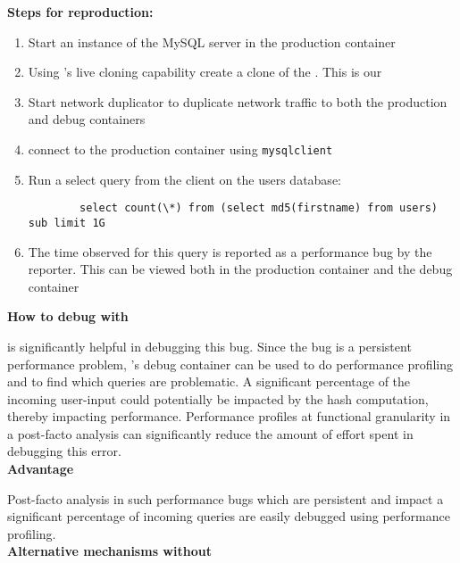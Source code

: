 \noindent \textbf{Steps for reproduction:} \\

\begin{adjustwidth}{0.5cm}{}
	\begin{enumerate}
		\item Start an instance of the MySQL server in the production container
		\item Using \parikshan's live cloning capability create a clone of the \productioncontainer. This is our \debugcontainer
		\item Start network duplicator to duplicate network traffic to both the production and debug containers
		\item connect to the production container using \texttt{mysqlclient}
		\item Run a select query from the client on the users database:
		
		\begin{lstlisting}
		select count(\*) from (select md5(firstname) from users) sub limit 1G
		\end{lstlisting}
		
		\item The time observed for this query is reported as a performance bug by the reporter. This can be viewed both in the production container and the debug container
		
	\end{enumerate}
\end{adjustwidth}	

\noindent \textbf{How to debug with \parikshan}

\parikshan is significantly helpful in debugging this bug. Since the bug is a persistent performance problem, \parikshan's debug container can be used to do performance profiling and to find which queries are problematic. A significant percentage of the incoming user-input could potentially be impacted by the hash computation, thereby impacting performance. Performance profiles at functional granularity in a post-facto analysis can significantly reduce the amount of effort spent in debugging this error.\\

\noindent \textbf{Advantage}

Post-facto analysis in such performance bugs which are persistent and impact a significant percentage of incoming queries are easily debugged using performance profiling.\\

\noindent \textbf{Alternative mechanisms without \parikshan}

